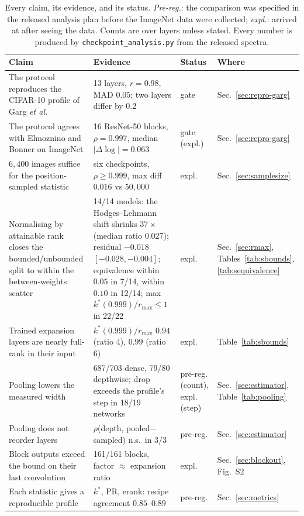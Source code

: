 \documentclass[10pt,journal,compsoc]{IEEEtran}
\begin{document}
\begin{table}[t]
  \centering
  \caption{Every claim, its evidence, and its status. \emph{Pre-reg.}:
  the comparison was specified in the released analysis plan before the
  ImageNet data were collected; \emph{expl.}: arrived at after seeing the
  data. Counts are over layers unless stated. Every number is produced by
  \texttt{checkpoint\_analysis.py} from the released spectra.}
  \label{tab:claims}
  \scriptsize
  \begin{tabular}{p{4.3cm}p{5.9cm}lp{2.5cm}}
  \toprule
  Claim & Evidence & Status & Where \\
  \midrule
  The protocol reproduces the CIFAR-10 profile of Garg \emph{et al.} & 13 layers, $r = 0.98$, MAD $0.05$; two layers differ by $0.2$ & gate & Sec.~\ref{sec:repro-garg} \\
  The protocol agrees with Elmoznino and Bonner on ImageNet & 16 ResNet-50 blocks, $\rho = 0.997$, median $|\Delta \log| = 0.063$ & gate (expl.) & Sec.~\ref{sec:repro-garg} \\
  $6{,}400$ images suffice for the position-sampled statistic & six checkpoints, $\rho \ge 0.999$, max diff $0.016$ vs $50{,}000$ & expl. & Sec.~\ref{sec:samplesize} \\
  Normalising by attainable rank closes the bounded/unbounded split to within the between-weights scatter & 14/14 models: the Hodges--Lehmann shift shrinks $37\times$ (median ratio $0.027$); residual $-0.018$ $[-0.028, -0.004]$; equivalence within $0.05$ in 7/14, within $0.10$ in 12/14; max $k^*(0.999)/r_{\max} \le 1$ in 22/22 & expl. & Sec.~\ref{sec:rmax}, Tables~\ref{tab:sbounds}, \ref{tab:sequivalence} \\
  Trained expansion layers are nearly full-rank in their input & $k^*(0.999)/r_{\max}$ $0.94$ (ratio 4), $0.99$ (ratio 6) & expl. & Table~\ref{tab:sbounds} \\
  Pooling lowers the measured width & 687/703 dense, 79/80 depthwise; drop exceeds the profile's step in 18/19 networks & pre-reg. (count), expl. (step) & Sec.~\ref{sec:estimator}, Table~\ref{tab:pooling} \\
  Pooling does not reorder layers & $\rho$(depth, pooled$-$sampled) n.s.\ in 3/3 & pre-reg. & Sec.~\ref{sec:estimator} \\
  Block outputs exceed the bound on their last convolution & 161/161 blocks, factor $\approx$ expansion ratio & expl. & Sec.~\ref{sec:blockout}, Fig.~S2 \\
  Each statistic gives a reproducible profile & $k^*$, PR, erank: recipe agreement $0.85$--$0.89$ & pre-reg. & Sec.~\ref{sec:metrics} \\

\end{tabular}
\end{table}
\end{document}

